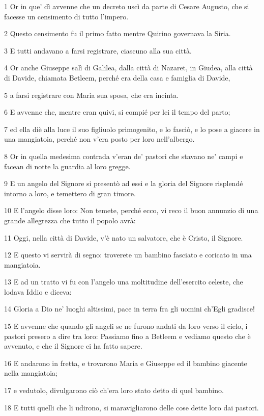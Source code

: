 \par 1 Or in que' dì avvenne che un decreto uscì da parte di Cesare Augusto, che si facesse un censimento di tutto l'impero.
\par 2 Questo censimento fu il primo fatto mentre Quirino governava la Siria.
\par 3 E tutti andavano a farsi registrare, ciascuno alla sua città.
\par 4 Or anche Giuseppe salì di Galilea, dalla città di Nazaret, in Giudea, alla città di Davide, chiamata Betleem, perché era della casa e famiglia di Davide,
\par 5 a farsi registrare con Maria sua sposa, che era incinta.
\par 6 E avvenne che, mentre eran quivi, si compié per lei il tempo del parto;
\par 7 ed ella diè alla luce il suo figliuolo primogenito, e lo fasciò, e lo pose a giacere in una mangiatoia, perché non v'era posto per loro nell'albergo.
\par 8 Or in quella medesima contrada v'eran de' pastori che stavano ne' campi e facean di notte la guardia al loro gregge.
\par 9 E un angelo del Signore si presentò ad essi e la gloria del Signore risplendé intorno a loro, e temettero di gran timore.
\par 10 E l'angelo disse loro: Non temete, perché ecco, vi reco il buon annunzio di una grande allegrezza che tutto il popolo avrà:
\par 11 Oggi, nella città di Davide, v'è nato un salvatore, che è Cristo, il Signore.
\par 12 E questo vi servirà di segno: troverete un bambino fasciato e coricato in una mangiatoia.
\par 13 E ad un tratto vi fu con l'angelo una moltitudine dell'esercito celeste, che lodava Iddio e diceva:
\par 14 Gloria a Dio ne' luoghi altissimi, pace in terra fra gli uomini ch'Egli gradisce!
\par 15 E avvenne che quando gli angeli se ne furono andati da loro verso il cielo, i pastori presero a dire tra loro: Passiamo fino a Betleem e vediamo questo che è avvenuto, e che il Signore ci ha fatto sapere.
\par 16 E andarono in fretta, e trovarono Maria e Giuseppe ed il bambino giacente nella mangiatoia;
\par 17 e vedutolo, divulgarono ciò ch'era loro stato detto di quel bambino.
\par 18 E tutti quelli che li udirono, si maravigliarono delle cose dette loro dai pastori.
